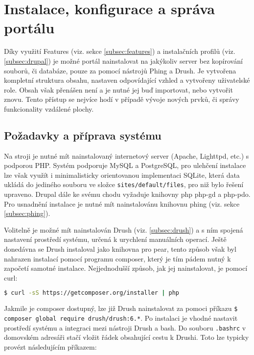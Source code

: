 \chapter{Instalace, konfigurace a správa portálu}
\label{chap:instalace}

Díky využití Features (viz. sekce \ref{subsec:features}) a instalačních profilů (viz. \ref{subsec:drupal}) je možné portál nainstalovat na jakýkoliv server bez kopírování souborů, či databáze, pouze za pomocí nástrojů Phing a Drush. Je vytvořena kompletní struktura obsahu, nastaven odpovídající vzhled a vytvořeny uživatelské role. Obsah však přenášen není a je nutné jej buď importovat, nebo vytvořit znovu. Tento přístup se nejvíce hodí v případě vývoje nových prvků, či správy funkcionality vzdálené plochy.

\section{Požadavky a příprava systému}

Na stroji je nutné mít nainstalovaný internetový server (Apache, Lighttpd, etc.) s podporou PHP. Systém podporuje MySQL a PostgreSQL, pro ulehčení instalace lze však využít i minimalisticky orientovanou implementaci SQLite, která data ukládá do jediného souboru ve složce \texttt{sites/default/files}, pro niž bylo řešení upraveno. Drupal dále ke svému chodu vyžaduje knihovny php php-gd a php-pdo. Pro usnadnění instalace je nutné mít nainstalovánu knihovnu phing (viz. sekce \ref{subsec:phing}).

Volitelně je možné mít nainstalován Drush (viz. \ref{subsec:drush}) a s ním spojená nastavení prostředí systému, určená k urychlení manuálních operací. Ještě donedávna se Drush instaloval jako knihovna pro \gls{pear}, tento způsob však byl nahrazen instalací pomocí programu \gls{composer}, který je tím pádem nutný k započetí samotné instalace. Nejjednodušší způsob, jak jej nainstalovat, je pomocí \gls{curl}:

\begin{lstlisting}[language=bash]
  $ curl -sS https://getcomposer.org/installer | php
\end{lstlisting}

Jakmile je composer dostupný, lze již Drush nainstalovat za pomoci příkazu \texttt{\$ composer global require drush/drush:6.*}. Po instalaci je vhodné nastavit prostředí systému a integraci mezi nástroji Drush a \gls{bash}. Do souboru \texttt{.bashrc} v domovském adresáři stačí vložit řádek obsahující cestu k Drushi. Toto lze typicky provézt následujícím příkazem:

